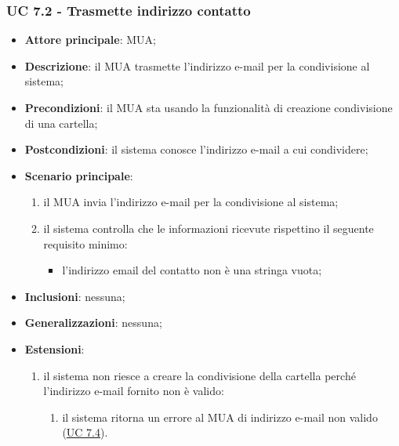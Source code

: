     \subsubsection{UC 7.2 - Trasmette indirizzo contatto} \label{sec:UC7.2}
    \begin{itemize}
        \item \textbf{Attore principale}: MUA;
        \item \textbf{Descrizione}: il MUA trasmette l'indirizzo e-mail per la condivisione al sistema;
        \item \textbf{Precondizioni}: il MUA sta usando la funzionalità di creazione condivisione di una cartella;
        \item \textbf{Postcondizioni}: il sistema conosce l'indirizzo e-mail a cui condividere;
        \item \textbf{Scenario principale}:
            \begin{enumerate}
                \item il MUA invia l'indirizzo e-mail per la condivisione al sistema;
                \item il sistema controlla che le informazioni ricevute rispettino il seguente requisito minimo:
                    \begin{itemize}
                        \item l'indirizzo email del contatto non è una stringa vuota;
                    \end{itemize}
            \end{enumerate}
        \item \textbf{Inclusioni}: nessuna;
        \item \textbf{Generalizzazioni}: nessuna;
        \item \textbf{Estensioni}:
            \begin{enumerate}[label=\alph*.]
                \item il sistema non riesce a creare la condivisione della cartella perché l'indirizzo e-mail fornito non è valido:
                \begin{enumerate}[label=\arabic*.]
                    \item il sistema ritorna un errore al MUA di indirizzo e-mail non valido (\hyperref[sec:UC7.4]{UC 7.4}).
                \end{enumerate}
            \end{enumerate}
    \end{itemize}


